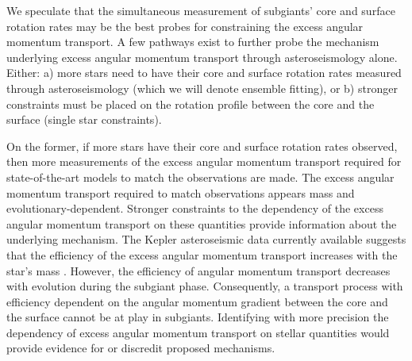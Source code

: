 
We speculate that the simultaneous measurement of subgiants' core and surface rotation rates may be the best probes for constraining the excess angular momentum transport.
A few pathways exist to further probe the mechanism underlying excess angular momentum transport through asteroseismology alone.
Either: a) more stars need to have their core and surface rotation rates measured through asteroseismology (which we will denote ensemble fitting), or b) stronger constraints must be placed on the rotation profile between the core and the surface (single star constraints).

On the former, if more stars have their core and surface rotation rates observed, then more measurements of the excess angular momentum transport required for state-of-the-art models to match the observations are made.
The excess angular momentum transport required to match observations appears mass and evolutionary-dependent.
Stronger constraints to the dependency of the excess angular momentum transport on these quantities provide information about the underlying mechanism.
The Kepler asteroseismic data currently available suggests that the efficiency of the excess angular momentum transport increases with the star's mass \citep{eggenberger_asteroseismology_2019}.
However, the efficiency of angular momentum transport decreases with evolution during the subgiant phase.
Consequently, a transport process with efficiency dependent on the angular momentum gradient between the core and the surface cannot be at play in subgiants.
Identifying with more precision the dependency of excess angular momentum transport on stellar quantities would provide evidence for or discredit proposed mechanisms.

